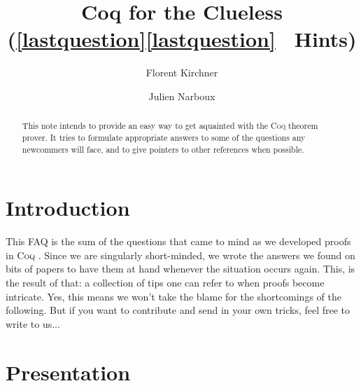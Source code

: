 \documentclass[a4paper]{faq}
\def\Coq{\textsc{Coq }}
\begin{document}



\title{Coq for the Clueless\\
  \large(\ifpdf\ref*{lastquestion}\else\protect\ref{lastquestion}\fi
  \ Hints)
}
\author{Florent Kirchner \and Julien Narboux}
\maketitle


\begin{abstract}
This note intends to provide an easy way to get aquainted with the
\Coq theorem prover. It tries to formulate appropriate answers
to some of the questions any newcommers will face, and to give
pointers to other references when possible.
\end{abstract}


\begin{multicols}{2}
\tableofcontents
\end{multicols}


\newpage
\section{Introduction}
This FAQ is the sum of the questions that came to mind as we developed
proofs in \Coq. Since we are singularly short-minded, we wrote the
answers we found on bits of papers to have them at hand whenever the
situation occurs again. This, is the result of that: a collection of
tips one can refer to when proofs become intricate. Yes, this means we
won't take the blame for the shortcomings of the following. But if you
want to contribute and send in your own tricks, feel free to write to
us...


\section{Presentation}



\end{document}

